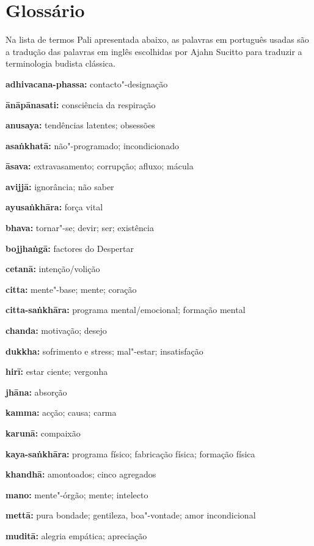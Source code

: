 \chapter{Glossário}

Na lista de termos Pali apresentada abaixo, as palavras em português usadas são
a tradução das palavras em inglês escolhidas por Ajahn Sucitto para traduzir a
terminologia budista clássica.

\bigskip

{\raggedright

\setlength{\parskip}{10pt}

\textbf{adhivacana-phassa:} contacto"-designação

\textbf{ānāpānasati:} consciência da respiração

\textbf{anusaya:} tendências latentes; obsessões

\textbf{asaṅkhatā:} não"-programado; incondicionado

\textbf{āsava:} extravasamento; corrupção; afluxo; mácula

\textbf{avijjā:} ignorância; não saber

\textbf{ayusaṅkhāra:} força vital

\textbf{bhava:} tornar"-se; devir; ser; existência

\textbf{bojjhaṅgā:} factores do Despertar

\textbf{cetanā:} intenção/volição

\textbf{citta:} mente"-base; mente; coração

\textbf{citta-saṅkhāra:} programa mental/emocional; formação \mbox{mental}

\textbf{chanda:} motivação; desejo

\textbf{dukkha:} sofrimento e stress; mal"-estar; insatisfação

\textbf{hirī:} estar ciente; vergonha

\textbf{jhāna:} absorção

\textbf{kamma:} acção; causa; carma

\textbf{karunā:} compaixão

\textbf{kaya-saṅkhāra:} programa físico; fabricação física; formação física

\textbf{khandhā:} amontoados; cinco agregados

\textbf{mano:} mente"-órgão; mente; intelecto

\textbf{mettā:} pura bondade; gentileza, boa"-vontade; amor incondicional

\textbf{muditā:} alegria empática; apreciação

}
